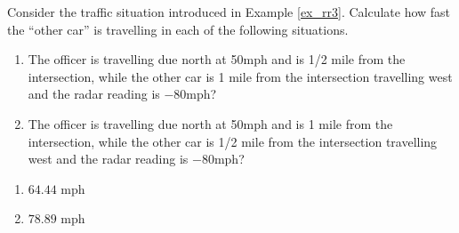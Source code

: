 {Consider the traffic situation introduced in Example \ref{ex_rr3}. Calculate how fast the ``other car'' is travelling in each of the following situations.
	\begin{enumerate}
	\item The officer is travelling due north at 50mph and is 1/2 mile from the intersection, while the other car is 1 mile from the intersection travelling west and the radar reading is $-80$mph?
	\item The officer is travelling due north at 50mph and is 1 mile from the intersection, while the other car is 1/2 mile from the intersection travelling west and the radar reading is $-80$mph?
	\end{enumerate}
}
{\begin{enumerate}
	\item $64.44$ mph
	\item	$78.89$ mph
\end{enumerate}
}

